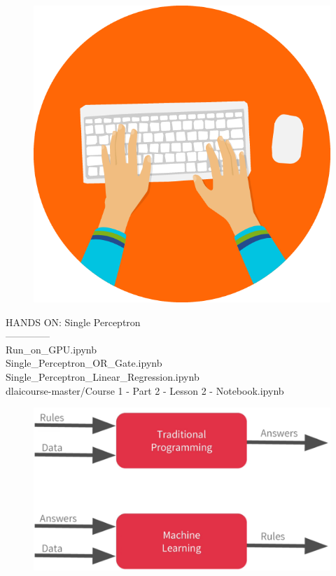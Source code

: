 \documentclass[10pt, compress]{beamer}
\begin{document}
\begin{frame}
  \vspace{.5cm}
  \begin{figure}
    \includegraphics[width=.2\linewidth, left]{imgs/hands_on_1}
  \end{figure}
  HANDS ON: Single Perceptron \\
  -------------- \\
  Run{\_}on{\_}GPU.ipynb \\
  Single{\_}Perceptron{\_}OR{\_}Gate.ipynb \\
  Single{\_}Perceptron{\_}Linear{\_}Regression.ipynb \\
  dlaicourse-master/Course 1 - Part 2 - Lesson 2 - Notebook.ipynb
\end{frame}

\begin{frame}
  \vspace{.5cm}
  \begin{figure}
    \includegraphics[width=.9\linewidth]{imgs/coursera_moroney/1}
  \end{figure}
\end{frame}


%
%
%
\end{document}
